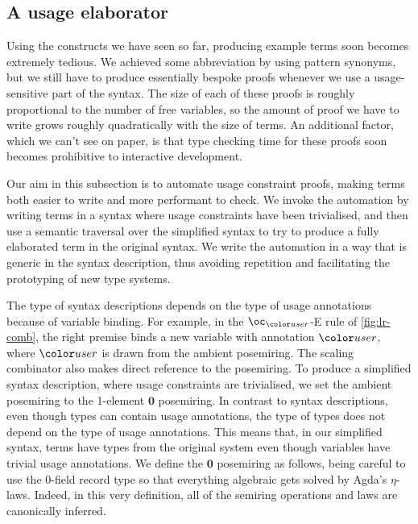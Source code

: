 \subsection{A usage elaborator}\label{sec:usage-elaborator}

Using the constructs we have seen so far, producing example terms soon becomes
extremely tedious.
We achieved some abbreviation by using pattern synonyms, but we still have to
produce essentially bespoke proofs whenever we use a usage-sensitive part of the
syntax.
The size of each of these proofs is roughly proportional to the number of free
variables, so the amount of proof we have to write grows roughly quadratically
with the size of terms.
An additional factor, which we can't see on paper, is that type checking time
for these proofs soon becomes prohibitive to interactive development.

Our aim in this subsection is to automate usage constraint proofs, making terms
both easier to write and more performant to check.
We invoke the automation by writing terms in a syntax where usage constraints
have been trivialised, and then use a semantic traversal over the simplified
syntax to try to produce a fully elaborated term in the original syntax.
We write the automation in a way that is generic in the syntax description, thus
avoiding repetition and facilitating the prototyping of new type systems.

The type of syntax descriptions depends on the type of usage annotations because
of variable binding.
For example, in the $\oc_{\gr r}$-E rule of \cref{fig:lr-comb}, the right
premise binds a new variable with annotation $\gr r$, where $\gr r$ is drawn
from the ambient posemiring.
The scaling combinator also makes direct reference to the posemiring.
To produce a simplified syntax description, where usage constraints are
trivialised, we set the ambient posemiring to the 1-element $\mathbf0$
posemiring.
In contrast to syntax descriptions, even though types can contain usage
annotations, the type of types does not depend on the type of usage annotations.
This means that, in our simplified syntax, terms have types from the original
system even though variables have trivial usage annotations.
We define the $\mathbf0$ posemiring as follows, being careful to use the
0-field record type \AgdaRecord{$\top$} so that everything algebraic gets
solved by Agda's $\eta$-laws.
Indeed, in this very definition, all of the semiring operations and laws are
canonically inferred.



